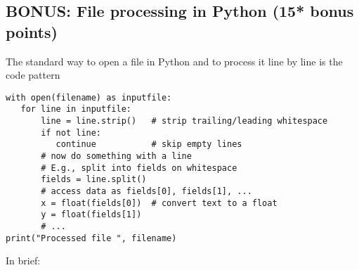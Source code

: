 \documentclass[letterpaper]{scrartcl}
\begin{document}
\subsection{BONUS: File processing in Python (15* bonus points)}
The standard way to open a file in Python and to process it line by
line is the code pattern
\begin{verbatim}
with open(filename) as inputfile:
   for line in inputfile:
       line = line.strip()   # strip trailing/leading whitespace
       if not line:
          continue           # skip empty lines
       # now do something with a line
       # E.g., split into fields on whitespace
       fields = line.split()
       # access data as fields[0], fields[1], ... 
       x = float(fields[0])  # convert text to a float 
       y = float(fields[1])
       # ...
print("Processed file ", filename)
\end{verbatim}
In brief: 
\end{document}
